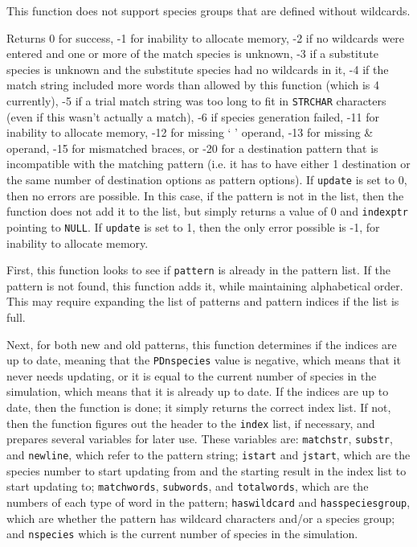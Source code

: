 \documentclass {book}
\newcommand {\ttt} {\texttt}
\begin{document}
\begin{description}
This function does not support species groups that are defined without wildcards.

Returns 0 for success, -1 for inability to allocate memory, -2 if no wildcards were entered and one or more of the match species is unknown, -3 if a substitute species is unknown and the substitute species had no wildcards in it, -4 if the match string included more words than allowed by this function (which is 4 currently), -5 if a trial match string was too long to fit in \ttt{STRCHAR} characters (even if this wasn't actually a match), -6 if species generation failed, -11 for inability to allocate memory, -12 for missing ` ' operand, -13 for missing \& operand, -15 for mismatched braces, or -20 for a destination pattern that is incompatible with the matching pattern (i.e. it has to have either 1 destination or the same number of destination options as pattern options). If \ttt{update} is set to 0, then no errors are possible. In this case, if the pattern is not in the list, then the function does not add it to the list, but simply returns a value of 0 and \ttt{indexptr} pointing to \ttt{NULL}. If \ttt{update} is set to 1, then the only error possible is -1, for inability to allocate memory.

First, this function looks to see if \ttt{pattern} is already in the pattern list. If the pattern is not found, this function adds it, while maintaining alphabetical order. This may require expanding the list of patterns and pattern indices if the list is full.

Next, for both new and old patterns, this function determines if the indices are up to date, meaning that the \ttt{PDnspecies} value is negative, which means that it never needs updating, or it is equal to the current number of species in the simulation, which means that it is already up to date. If the indices are up to date, then the function is done; it simply returns the correct index list. If not, then the function figures out the header to the \ttt{index} list, if necessary, and prepares several variables for later use. These variables are: \ttt{matchstr}, \ttt{substr}, and \ttt{newline}, which refer to the pattern string; \ttt{istart} and \ttt{jstart}, which are the species number to start updating from and the starting result in the index list to start updating to; \ttt{matchwords}, \ttt{subwords}, and \ttt{totalwords}, which are the numbers of each type of word in the pattern; \ttt{haswildcard} and \ttt{hasspeciesgroup}, which are whether the pattern has wildcard characters and/or a species group; and \ttt{nspecies} which is the current number of species in the simulation.


\end{description}
\end{document}
